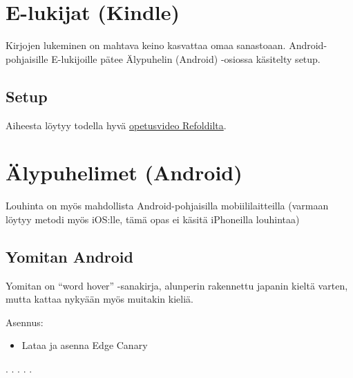 \documentclass[
]{book}
\providecommand{\tightlist}{%
  \setlength{\itemsep}{0pt}\setlength{\parskip}{0pt}}
\begin{document}
\chapter{E-lukijat (Kindle)}\label{e-lukijat-kindle}

Kirjojen lukeminen on mahtava keino kasvattaa omaa sanastoaan. Android-pohjaisille E-lukijoille pätee Älypuhelin (Android) -osiossa käsitelty setup.

\section{Setup}\label{setup}

Aiheesta löytyy todella hyvä \href{https://youtu.be/_WT2FukXNAg?si=GimlPz3MYkpzeB9_}{opetusvideo Refoldilta}.

\chapter{Älypuhelimet (Android)}\label{Mobiili}

Louhinta on myös mahdollista Android-pohjaisilla mobiililaitteilla (varmaan löytyy metodi myös iOS:lle, tämä opas ei käsitä iPhoneilla louhintaa)

\section{Yomitan Android}\label{yomitan-android}

Yomitan on ``word hover'' -sanakirja, alunperin rakennettu japanin kieltä varten, mutta kattaa nykyään myös muitakin kieliä.

Asennus:

\begin{itemize}
\tightlist
\item
  Lataa ja asenna Edge Canary
\end{itemize}

.
.
.
.
.


\end{document}
